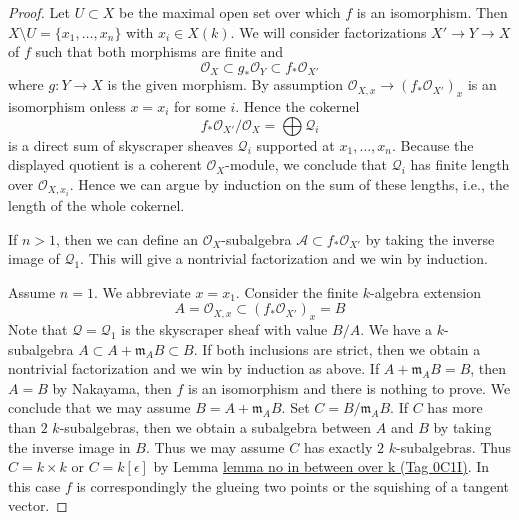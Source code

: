 \documentclass{amsart}
\theoremstyle{plain}
\theoremstyle{definition}
\theoremstyle{remark}
\numberwithin{equation}{subsection}
\begin{document}
\begin{proof}
Let $U \subset X$ be the maximal open set over which $f$ is an isomorphism.
Then $X \setminus U = \{x_1, \ldots, x_n\}$ with $x_i \in X(k)$.
We will consider factorizations $X' \to Y \to X$ of $f$ such that
both morphisms are finite and
$$
\mathcal{O}_X \subset g_*\mathcal{O}_Y \subset f_*\mathcal{O}_{X'}
$$
where $g : Y \to X$ is the given morphism. By assumption
$\mathcal{O}_{X, x} \to (f_*\mathcal{O}_{X'})_x$ is an isomorphism
onless $x = x_i$ for some $i$. Hence the cokernel
$$
f_*\mathcal{O}_{X'}/\mathcal{O}_X = \bigoplus \mathcal{Q}_i
$$
is a direct sum of skyscraper sheaves $\mathcal{Q}_i$ supported at
$x_1, \ldots, x_n$.
Because the displayed quotient is a coherent $\mathcal{O}_X$-module,
we conclude that $\mathcal{Q}_i$ has finite length over
$\mathcal{O}_{X, x_i}$. Hence we can argue
by induction on the sum of these lengths, i.e., the length of
the whole cokernel.

\medskip\noindent
If $n > 1$, then we can define an $\mathcal{O}_X$-subalgebra
$\mathcal{A} \subset f_*\mathcal{O}_{X'}$ by taking the inverse
image of $\mathcal{Q}_1$. This will give a nontrivial factorization
and we win by induction.

\medskip\noindent
Assume $n = 1$. We abbreviate $x = x_1$. Consider the finite
$k$-algebra extension
$$
A = \mathcal{O}_{X, x} \subset (f_*\mathcal{O}_{X'})_x = B
$$
Note that $\mathcal{Q} = \mathcal{Q}_1$ is the skyscraper sheaf
with value $B/A$.
We have a $k$-subalgebra $A \subset A + \mathfrak m_A B \subset B$.
If both inclusions are strict, then we obtain a nontrivial
factorization and we win by induction as above.
If $A + \mathfrak m_A B = B$, then $A = B$ by Nakayama, then
$f$ is an isomorphism and there is nothing to prove.
We conclude that we may assume $B = A + \mathfrak m_A B$.
Set $C = B/\mathfrak m_A B$. If $C$ has more than $2$
$k$-subalgebras, then we obtain a subalgebra between $A$
and $B$ by taking the inverse image in $B$. Thus we may
assume $C$ has exactly $2$ $k$-subalgebras. Thus $C = k \times k$
or $C = k[\epsilon]$ by Lemma \href{https://stacks.math.columbia.edu/tag/0C1I}{lemma no in between over k (Tag 0C1I)}.
In this case $f$ is correspondingly the glueing two points or the
squishing of a tangent vector.
\end{proof}
\end{document}

